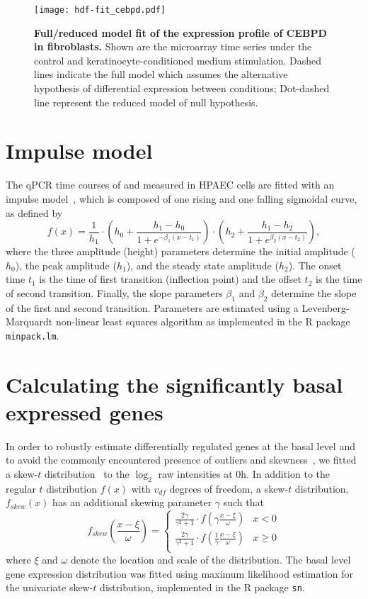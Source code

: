 \begin{figure}[!ht]
\begin{center}
\texttt{[image: hdf-fit\_cebpd.pdf]}
\end{center}
\caption[Full/reduced model fit of gene expression profile]{
{\bf Full/reduced model fit of the expression profile of CEBPD in fibroblasts.}
Shown are the microarray time series under the control and 
keratinocyte-conditioned medium stimulation. Dashed lines indicate the full
model which assumes the alternative hypothesis of differential expression
between conditions; Dot-dashed line represent the reduced model of null 
hypothesis.
}
\label{fig:full_reduced}
\end{figure}

\section{Impulse model}
\label{sec:impulse}
The qPCR time courses of \tnfa and \sdfonea measured in HPAEC cells are fitted with an impulse model~\cite{Chechik2009}, which is composed of one rising and one falling sigmoidal curve, as defined by
\[
f(x) = \frac{1}{h_1} \cdot \left(h_0+\frac{h_1-h_0}{1+e^{-\beta_1(x-t_1)}}\right) \cdot
\left(h_2+\frac{h_1-h_2}{1+e^{\beta_2(x-t_2)}}\right), 
\]
where the three amplitude (height) parameters determine the initial amplitude 
($h_0$), the peak amplitude
($h_1$), and the steady state amplitude ($h_2$). The onset time $t_1$ is the time of  first transition (inflection point) and the offset $t_2$ is the time of second  transition. Finally, the slope parameters $\beta_1$ and $\beta_2$ determine the slope of the first and second transition. Parameters are estimated using a  Levenberg-Marquardt non-linear least squares  algorithm as implemented in the R package \texttt{minpack.lm}.

\section{Calculating the significantly basal expressed genes}
In order to robustly estimate differentially regulated genes at the basal level and to avoid the commonly encountered 
presence of outliers and skewness~\cite{Marko2011}, we fitted 
a skew-$t$  distribution~\cite{Azzalini2003} to the $\log_2$ raw intensities at 0h. 
In addition to the regular $t$ distribution $f(x)$ with $v_{df}$ degrees of freedom, a skew-$t$ distribution,  $f_{skew}(x)$ has an additional 
skewing parameter $\gamma$ such that  
\[
f_{skew}\left(\frac{x-\xi}{\omega}\right) = 
\begin{cases}
\frac{2\gamma}{\gamma^2+1} \cdot f\left(\gamma\frac{x-\xi}{\omega}\right) & x<0\\
\frac{2\gamma}{\gamma^2+1} \cdot f\left(\frac{1}{\gamma}\frac{x-\xi}{\omega}\right) & x \geqslant 0\\
\end{cases}
\]
where $\xi$  and  $\omega$ denote the location and scale of the distribution.  
The basal level gene expression distribution was fitted using maximum likelihood 
estimation for the 
univariate skew-$t$ distribution, implemented in the R package \texttt{sn}.

%
%
